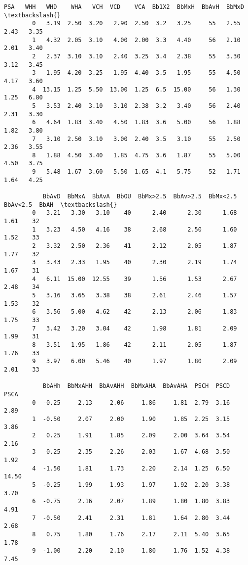\documentclass[11pt]{article}
\begin{document}
\begin{Verbatim}[commandchars=\\\{\}]
             PSA   WHH   WHD    WHA   VCH  VCD    VCA  Bb1X2  BbMxH  BbAvH  BbMxD  \textbackslash{}
        0   3.19  2.50  3.20   2.90  2.50  3.2   3.25     55   2.55   2.43   3.35   
        1   4.32  2.05  3.10   4.00  2.00  3.3   4.40     56   2.10   2.01   3.40   
        2   2.37  3.10  3.10   2.40  3.25  3.4   2.38     55   3.30   3.12   3.45   
        3   1.95  4.20  3.25   1.95  4.40  3.5   1.95     55   4.50   4.17   3.60   
        4  13.15  1.25  5.50  13.00  1.25  6.5  15.00     56   1.30   1.25   6.80   
        5   3.53  2.40  3.10   3.10  2.38  3.2   3.40     56   2.40   2.31   3.30   
        6   4.64  1.83  3.40   4.50  1.83  3.6   5.00     56   1.88   1.82   3.80   
        7   3.10  2.50  3.10   3.00  2.40  3.5   3.10     55   2.50   2.36   3.55   
        8   1.88  4.50  3.40   1.85  4.75  3.6   1.87     55   5.00   4.50   3.75   
        9   5.48  1.67  3.60   5.50  1.65  4.1   5.75     52   1.71   1.64   4.25   
        
           BbAvD  BbMxA  BbAvA  BbOU  BbMx>2.5  BbAv>2.5  BbMx<2.5  BbAv<2.5  BbAH  \textbackslash{}
        0   3.21   3.30   3.10    40      2.40      2.30      1.68      1.61    32   
        1   3.23   4.50   4.16    38      2.68      2.50      1.60      1.52    33   
        2   3.32   2.50   2.36    41      2.12      2.05      1.87      1.77    32   
        3   3.43   2.33   1.95    40      2.30      2.19      1.74      1.67    31   
        4   6.11  15.00  12.55    39      1.56      1.53      2.67      2.48    34   
        5   3.16   3.65   3.38    38      2.61      2.46      1.57      1.53    32   
        6   3.56   5.00   4.62    42      2.13      2.06      1.83      1.75    33   
        7   3.42   3.20   3.04    42      1.98      1.81      2.09      1.99    31   
        8   3.51   1.95   1.86    42      2.11      2.05      1.87      1.76    33   
        9   3.97   6.00   5.46    40      1.97      1.80      2.09      2.01    33   
        
           BbAHh  BbMxAHH  BbAvAHH  BbMxAHA  BbAvAHA  PSCH  PSCD   PSCA  
        0  -0.25     2.13     2.06     1.86     1.81  2.79  3.16   2.89  
        1  -0.50     2.07     2.00     1.90     1.85  2.25  3.15   3.86  
        2   0.25     1.91     1.85     2.09     2.00  3.64  3.54   2.16  
        3   0.25     2.35     2.26     2.03     1.67  4.68  3.50   1.92  
        4  -1.50     1.81     1.73     2.20     2.14  1.25  6.50  14.50  
        5  -0.25     1.99     1.93     1.97     1.92  2.20  3.38   3.70  
        6  -0.75     2.16     2.07     1.89     1.80  1.80  3.83   4.91  
        7  -0.50     2.41     2.31     1.81     1.64  2.80  3.44   2.68  
        8   0.75     1.80     1.76     2.17     2.11  5.40  3.65   1.78  
        9  -1.00     2.20     2.10     1.80     1.76  1.52  4.38   7.45  
\end{Verbatim}
            
\end{document}
